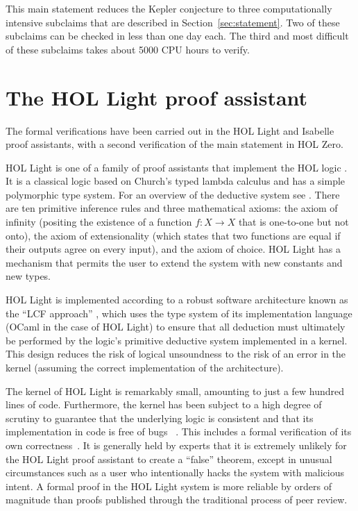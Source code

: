 

This main statement reduces the Kepler conjecture to three
computationally intensive subclaims that are described in
Section~\ref{sec:statement}.  Two of these subclaims can be checked in
less than one day each.  The third and most difficult of these
subclaims takes about 5000 CPU hours to verify.



\section{The HOL Light proof assistant}\label{sec:hl}

The formal verifications have been carried out in the HOL Light and
Isabelle proof assistants, with a second verification of the main statement
in HOL Zero.

HOL Light is one of a family of proof assistants that implement the
HOL logic \cite{gordon1993introduction}.  It is a classical logic
based on Church's typed lambda calculus and has a simple polymorphic
type system.  For an overview of the deductive system see
\cite{harrison2009hol}.  There are ten primitive inference rules and
three mathematical axioms: the axiom of infinity (positing the
existence of a function $f:X\to X$ that is one-to-one but not onto),
the axiom of extensionality (which states that two functions are equal
if their outputs agree on every input), and the axiom of choice.  HOL
Light has a mechanism that permits the user to extend the system with
new constants and new types.

HOL Light is implemented according to a robust software architecture
known as the ``LCF approach'' \cite{gordon1979edinburgh}, which uses
the type system of its implementation language (OCaml in the case of
HOL Light) to ensure that all deduction must ultimately be
performed by the logic's primitive deductive system implemented in a
kernel.  This design reduces the risk of logical unsoundness to the
risk of an error in the kernel (assuming the correct implementation of
the architecture).

The kernel of HOL Light is remarkably small, amounting to just a few
hundred lines of code.  Furthermore, the kernel has been subject to a
high degree of scrutiny to guarantee that the underlying logic is
consistent and that its implementation in code is free of
bugs~\cite{DBLP:conf/itp/KumarAMO14} \cite{hales-bourbaki2014}.  This
includes a formal verification of its own
correctness~\cite{DBLP:conf/cade/Harrison06}.  It is generally held by
experts that it is extremely unlikely for the HOL Light proof
assistant to create a ``false'' theorem, except in unusual
circumstances such as a user who intentionally hacks the system with
malicious intent.  A formal proof in the HOL Light system is more
reliable by orders of magnitude than proofs published through the
traditional process of peer review.


